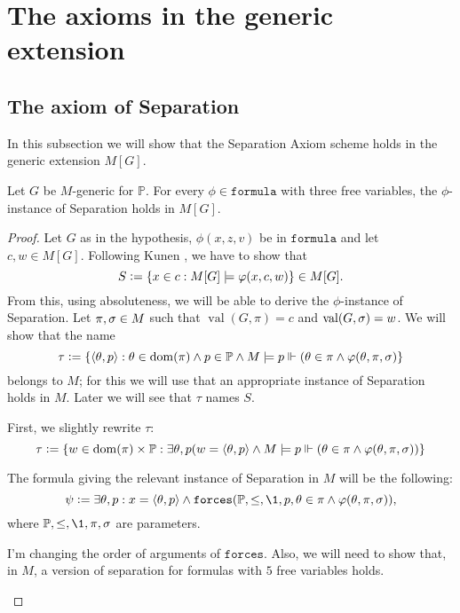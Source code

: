 \documentclass[11pt,english]{article}
\renewcommand{\PP}{\mathbb{P}}
\newcommand{\formula}{\ensuremath{\mathtt{formula}}}
\newcommand{\forceisa}{\mathtt{forces}}
\DeclareMathOperator{\val}{val}
\begin{document}
\section{The axioms in the generic extension}
\subsection{The axiom of Separation}
In this subsection we will show that the Separation Axiom scheme holds
in the generic extension $M[G]$. 

\begin{lemma}
  Let $G$ be $M$-generic for $\PP$. For every $\phi\in\formula$ with
  three free variables, the $\phi$-instance of Separation holds in
  $M[G]$.
\end{lemma}
\begin{proof}
  Let $G$ as in the hypothesis, $\phi(x,z,v)$ be in \formula{} and let
  $c,w\in M[G]$. Following Kunen \cite[Lemma IV.2.6]{kunen2011set},
  we have to show that 
  \[
  S\mathrel{\mathop:}=\{x\in c : M[G]\models \varphi(x,c,w)\} \in M[G].
  \]
  From this, using absoluteness, we will be able to derive the
  $\phi$-instance of Separation. Let $\pi,\sigma\in M$ such that 
  $\val(G,\pi)=c$ and $\val(G,\sig)=w$.
  We will show that the name
  \[
  \tau \defi \{\lb\th,p\rb: \th\in\dom(\pi) \y p\in \PP\y
  M\models p\forces(\th\in\pi\y\phi(\th,\pi,\sig)\}
  \]
  belongs to $M$; for this we will use that an appropriate instance of
  Separation holds in $M$. Later we will see that $\tau$ names $S$.
  
  First, we slightly rewrite $\tau$:
  \[
  \tau \defi \{w\in\dom(\pi)\times\PP :\exists \th,p (w=\lb\th,p\rb \y 
  M\models p \forces(\th\in\pi\y\phi(\th,\pi,\sig))\}
  \]
  
  The formula giving the relevant instance of Separation in $M$ will be the
  following:
  \[
  \psi \defi \exists \th,p : x=\lb\th,p\rb \y \forceisa(\PP,\leq,\1,p,\th\in\pi\y\phi(\th,\pi,\sig)),
  \]
  where $\PP,\leq,\1,\pi,\sig$ are parameters.
  \begin{framed}
    I'm changing the order of arguments of $\forceisa$. Also, we
    will need to show that, in $M$, a version of separation for formulas
    with  $5$ free variables holds.


\end{framed}
\end{proof}
\end{document}
